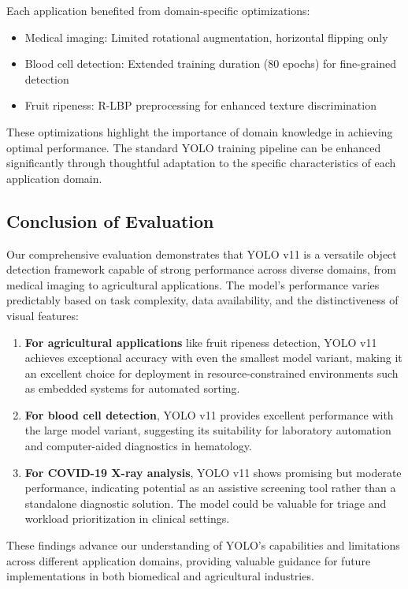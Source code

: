 \begin{multicols}{2}
Each application benefited from domain-specific optimizations:

\begin{itemize}
    \item Medical imaging: Limited rotational augmentation, horizontal flipping only
    \item Blood cell detection: Extended training duration (80 epochs) for fine-grained detection
    \item Fruit ripeness: R-LBP preprocessing for enhanced texture discrimination
\end{itemize}

These optimizations highlight the importance of domain knowledge in achieving optimal performance. The standard YOLO training pipeline can be enhanced significantly through thoughtful adaptation to the specific characteristics of each application domain.

\subsection{Conclusion of Evaluation}

Our comprehensive evaluation demonstrates that YOLO v11 is a versatile object detection framework capable of strong performance across diverse domains, from medical imaging to agricultural applications. The model's performance varies predictably based on task complexity, data availability, and the distinctiveness of visual features:

\begin{enumerate}
    \item \textbf{For agricultural applications} like fruit ripeness detection, YOLO v11 achieves exceptional accuracy with even the smallest model variant, making it an excellent choice for deployment in resource-constrained environments such as embedded systems for automated sorting.
    
    \item \textbf{For blood cell detection}, YOLO v11 provides excellent performance with the large model variant, suggesting its suitability for laboratory automation and computer-aided diagnostics in hematology.
    
    \item \textbf{For COVID-19 X-ray analysis}, YOLO v11 shows promising but moderate performance, indicating potential as an assistive screening tool rather than a standalone diagnostic solution. The model could be valuable for triage and workload prioritization in clinical settings.
\end{enumerate}

These findings advance our understanding of YOLO's capabilities and limitations across different application domains, providing valuable guidance for future implementations in both biomedical and agricultural industries.
\end{multicols}